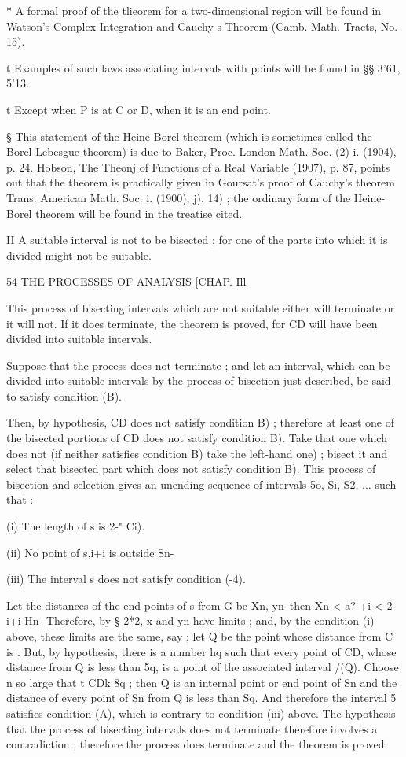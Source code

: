 * A formal proof of the tlieorem for a two-dimensional region will be
found in Watson's Complex Integration and Cauchy s Theorem (Camb.
Math. Tracts, No. 15).

t Examples of such laws associating intervals with points will be
found in §§ 3'61, 5'13.

t Except when P is at C or D, when it is an end point.

§ This statement of the Heine-Borel theorem (which is sometimes called
the Borel-Lebesgue theorem) is due to Baker, Proc. London Math. Soc.
(2) i. (1904), p. 24. Hobson, The Theonj of Functions of a Real
Variable (1907), p. 87, points out that the theorem is practically
given in Goursat's proof of Cauchy's theorem Trans. American Math.
Soc. i. (1900), j). 14) ; the ordinary form of the Heine-Borel theorem
will be found in the treatise cited.

II A suitable interval is not to be bisected ; for one of the parts
into which it is divided might not be suitable.



54 THE PROCESSES OF ANALYSIS [CHAP. Ill

This process of bisecting intervals which are not suitable either will
terminate or it will not. If it does terminate, the theorem is proved,
for CD will have been divided into suitable intervals.

Suppose that the process does not terminate ; and let an interval,
which can be divided into suitable intervals by the process of
bisection just described, be said to satisfy condition (B).

Then, by hypothesis, CD does not satisfy condition B) ; therefore at
least one of the bisected portions of CD does not satisfy condition
B). Take that one which does not (if neither satisfies condition B)
take the left-hand one) ; bisect it and select that bisected part
which does not satisfy condition B). This process of bisection and
selection gives an unending sequence of intervals 5o, Si, S2, ... such
that :

(i) The length of s is 2-" Ci).

(ii) No point of s,i+i is outside Sn-

(iii) The interval s does not satisfy condition (-4).

Let the distances of the end points of s from G be Xn, yn\ then Xn <
a? +i < 2 i+i Hn- Therefore, by § 2*2, x and yn have limits ; and, by
the condition (i) above, these limits are the same, say ; let Q be the
point whose distance from C is . But, by hypothesis, there is a number
hq such that every point of CD, whose distance from Q is less than 5q,
is a point of the associated interval /(Q). Choose n so large that t
CDk 8q ; then Q is an internal point or end point of Sn and the
distance of every point of Sn from Q is less than Sq. And therefore
the interval 5 satisfies condition (A), which is contrary to condition
(iii) above. The hypothesis that the process of bisecting intervals
does not terminate therefore involves a contradiction ; therefore the
process does terminate and the theorem is proved.

